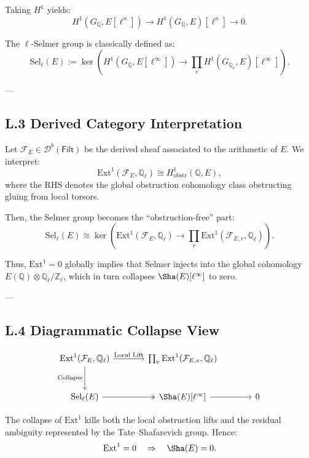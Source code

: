 Taking \( H^1 \) yields:
\[
H^1(G_\mathbb{Q}, E[\ell^n]) \longrightarrow H^1(G_\mathbb{Q}, E)[\ell^n] \longrightarrow 0.
\]

The \( \ell \)-Selmer group is classically defined as:
\[
\mathrm{Sel}_\ell(E) := \ker\left(H^1(G_\mathbb{Q}, E[\ell^\infty]) \to \prod_v H^1(G_{\mathbb{Q}_v}, E)[\ell^\infty] \right).
\]

---

\subsection*{L.3 Derived Category Interpretation}

Let \( \mathcal{F}_E \in \mathcal{D}^b(\mathsf{Filt}) \) be the derived sheaf associated to the arithmetic of \( E \).  
We interpret:
\[
\mathrm{Ext}^1(\mathcal{F}_E, \mathbb{Q}_\ell) \cong H^1_{\mathrm{obstr}}(\mathbb{Q}, E),
\]
where the RHS denotes the global obstruction cohomology class obstructing gluing from local torsors.

Then, the Selmer group becomes the “obstruction-free” part:
\[
\mathrm{Sel}_\ell(E) \cong \ker\left(\mathrm{Ext}^1(\mathcal{F}_E, \mathbb{Q}_\ell) \to \prod_v \mathrm{Ext}^1(\mathcal{F}_{E,v}, \mathbb{Q}_\ell)\right).
\]

Thus, \( \mathrm{Ext}^1 = 0 \) globally implies that Selmer injects into the global cohomology \( E(\mathbb{Q}) \otimes \mathbb{Q}_\ell/\mathbb{Z}_\ell \),  
which in turn collapses \( \Sha(E)[\ell^\infty] \) to zero.

---

\subsection*{L.4 Diagrammatic Collapse View}

\[
\begin{tikzcd}[row sep=large, column sep=large]
\mathrm{Ext}^1(\mathcal{F}_E, \mathbb{Q}_\ell) \arrow[r, "\text{Local Lift}"] \arrow[d, swap, "\text{Collapse}"] &
\prod_v \mathrm{Ext}^1(\mathcal{F}_{E,v}, \mathbb{Q}_\ell) \\
\mathrm{Sel}_\ell(E) \arrow[r, two heads] & \Sha(E)[\ell^\infty] \arrow[r] & 0
\end{tikzcd}
\]

The collapse of \( \mathrm{Ext}^1 \) kills both the local obstruction lifts and the residual ambiguity  
represented by the Tate–Shafarevich group.  
Hence:
\[
\mathrm{Ext}^1 = 0 \quad \Rightarrow \quad \Sha(E) = 0.
\]

